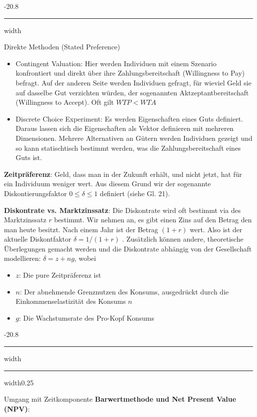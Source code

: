 \documentclass[9pt, landscape, fleqn]{scrartcl}
\makeatletter
\renewcommand{\subsection}{\@startsection{subsection}{1}{0mm}%
{-2\baselineskip}{0.8\baselineskip}%
{\hrule depth 0.2pt width\columnwidth\hrule depth0.75pt
width0.25\columnwidth\vspace*{1.2em}\large\bfseries\rmfamily}}
\renewcommand{\subsubsection}{\@startsection{subsubsection}{1}{0mm}%
{-2\baselineskip}{0.8\baselineskip}%
{\hrule depth 0.2pt width\columnwidth\vspace*{1.2em}\normalsize\bfseries\rmfamily}}
\makeatother
\begin{document}
\begin{multicols*}{3}
\subsubsection{Direkte Methoden (Stated Preference)}

\begin{itemize}
    \item Contingent Valuation: Hier werden Individuen mit einem Szenario konfrontiert und direkt über ihre Zahlungsbereitschaft (Willingness to Pay) befragt. Auf der anderen Seite werden Individuen gefragt, für wieviel Geld sie auf dasselbe Gut verzichten würden, der sogenannten Aktzeptantbereitschaft (Willingness to Accept). Oft gilt $WTP < WTA$
    \item Discrete Choice Experiment: Es werden Eigenschaften eines Guts definiert. Daraus lassen sich die Eigenschaften als Vektor definieren mit mehreren Dimensionen. Mehrere Alternativen an Gütern werden Individuen gezeigt und so kann statischtisch bestimmt werden, was die Zahlungsbereitschaft eines Guts ist.
\end{itemize}

\textbf{Zeitpräferenz}: Geld, dass man in der Zukunft erhält, und nicht jetzt, hat für ein Individuum weniger wert. Aus diesem Grund wir der sogenannte Diskontierungsfaktor $0 \leq \delta \leq 1$ definiert (siehe Gl. 21). \newline \newline

\textbf{Diskontrate vs. Marktzinssatz}: Die Diskontrate wird oft bestimmt via des Marktzinssatz $r$ bestimmt. Wir nehmen an, es gibt einen Zins auf den Betrag den man heute besitzt. Nach einem Jahr ist der Betrag $(1+r)$ wert. Also ist der aktuelle Diskontfaktor $\delta = 1/(1+r)$ .
Zusätzlich können andere, theoretische Überlegungen gemacht werden und die Diskontrate abhängig von der Gesellschaft modellieren: $\delta = z + ng$, wobei

\begin{itemize}
    \item $z$: Die pure Zeitpräferenz ist
    \item $n$: Der abnehmende Grenznutzen des Konsums, ausgedrückt durch die Einkommenselastizität des Konsums $n$
    \item $g$: Die Wachstumsrate des Pro-Kopf Konsums 
\end{itemize}



\subsection{Umgang mit Zeitkomponente}
\textbf{Barwertmethode und Net Present Value (NPV)}: 


\end{multicols*}
\end{document}
